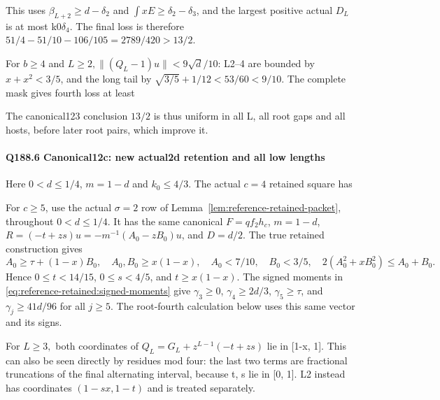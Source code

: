 This uses \(\beta_{L+2}\ge d- \delta_2\) and \(\int xE\ge \delta_2-\delta_3\), and the largest positive actual \(D_L\) is at most k0\(\delta_4\). The final loss is therefore \(51/4-51/10-106/105=2789/420>13/2\). 

For \(b\ge 4\) and \(L\ge 2,\allowbreak \allowbreak   \|(Q_L-1)u\|<9\sqrt{d}/10\): L2–4 are bounded by \(x+x^2<3/5\), and the long tail by \(\sqrt{3/5}+1/12<53/60<9/10\). The complete mask gives fourth loss at least



The canonical123 conclusion \(13/2\) is thus uniform in all L, all root gaps and all hosts, before later root pairs, which improve it.

\paragraph{Q188.6 Canonical12c: new actual2d retention and all low lengths}

Here \(0<d\le 1/4\), \(m=1-d\) and \(k_{0}\le 4/3.\) The actual \(c=4\) retained square has



For \(c\ge5\), use the actual \(\sigma=2\) row of
Lemma~\ref{lem:reference-retained-packet}, throughout \(0<d\le1/4\).
It has the same canonical \(F=qf_2h_c\), \(m=1-d\),
\(R=(-t+zs)u=-m^{-1}(A_0-zB_0)u\), and \(D=d/2\).
The true retained construction gives
\[
 A_0\ge\tau+(1-x)B_0,\quad A_0,B_0\ge x(1-x),\quad
 A_0<7/10,\quad B_0<3/5,\quad
 2(A_0^2+xB_0^2)\le A_0+B_0.
\]
Hence \(0\le t<14/15\), \(0\le s<4/5\), and \(t\ge x(1-x)\).
The signed moments in \eqref{eq:reference-retained:signed-moments}
give \(\gamma_3\ge0\), \(\gamma_4\ge2d/3\),
\(\gamma_5\ge\tau\), and \(\gamma_j\ge41d/96\) for all \(j\ge5\).
The root-fourth calculation below uses this same vector and its signs.

For \(L\ge 3,\allowbreak \allowbreak  \) both coordinates of \(Q_L=G_L+z^{L-1}(-t+zs)\) lie in [1-x, 1]. This can also be seen directly by residues mod four: the last two terms are fractional truncations of the final alternating interval, because t, s lie in [0, 1]. L2 instead has coordinates \((1-sx,\allowbreak \allowbreak  1-t)\) and is treated separately.

